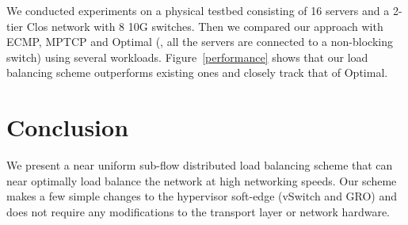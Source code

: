 We conducted experiments on a physical
testbed consisting of 16 servers and a 2-tier Clos network with 8 10G switches. 
Then we compared our approach with ECMP, MPTCP and Optimal (\ie{}, all the servers are connected to a non-blocking switch) using several workloads.
Figure~\ref{performance} shows that our load balancing scheme outperforms existing ones and closely track that of Optimal.
\section{Conclusion}
We present a near uniform sub-flow distributed load balancing scheme
that can near optimally load balance the network at high networking speeds.
Our scheme makes a few simple changes to the hypervisor soft-edge (vSwitch and GRO)
and does not require any modifications to the transport layer or network hardware.
